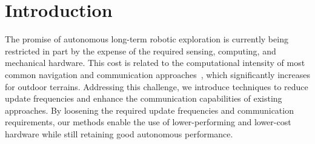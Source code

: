 \documentclass[letterpaper,10pt,conference,twoside]{IEEEtran}
\theoremstyle{definition}
\begin{document}
\section{Introduction}
\noindent
The promise of autonomous long-term robotic exploration is currently being restricted %
in part by the expense of the required sensing, computing, and mechanical hardware. %
This cost is related to the computational intensity of most common navigation and communication approaches~\cite{lluvia2021active,placed2022survey}, which significantly increases for %
outdoor terrains. Addressing this challenge, we introduce %
techniques to reduce update frequencies and enhance the communication capabilities of existing approaches. By loosening the required update frequencies and communication requirements, our methods enable the use of lower-performing and lower-cost hardware while still retaining good autonomous performance.
\end{document}
